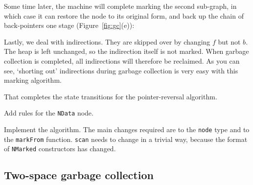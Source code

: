 Some time later, the machine will complete marking the second sub-graph,
in which case it can restore the node to its original form, and
back up the chain of back-pointers one stage (Figure~\ref{fig:gc}(e)):

Lastly, we deal with indirections.  They are skipped over by
changing $f$ but not $b$.  The heap is left unchanged, so the indirection itself
is not marked.  When garbage collection is completed, all indirections will
therefore be reclaimed.  As you can see, `shorting out' indirections during
garbage collection is very easy with this marking algorithm.

That completes the state transitions for the pointer-reversal algorithm.
\begin{exercise}
Add rules for the \mbox{\tt NData} node.
\end{exercise}
\begin{exercise}
Implement the algorithm.  The main changes required are to the \mbox{\tt node} type
and to the \mbox{\tt markFrom} function.  \mbox{\tt scan} needs to change in a trivial way,
because the format of \mbox{\tt NMarked} constructors has changed.
\end{exercise}

\subsection{Two-space garbage collection}

